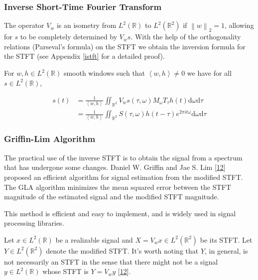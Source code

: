 \documentclass[american,]{article}
\theoremstyle{definition}
\theoremstyle{definition}
\theoremstyle{definition}
\theoremstyle{remark}
\begin{document}
\hypertarget{inverse-short-time-fourier-transform}{%
\subsubsection{Inverse Short-Time Fourier Transform}\label{inverse-short-time-fourier-transform}}

The operator \(V_w\) is an isometry from \(L^2(\mathbb{R})\) to \(L^2(\mathbb{R}^2)\)
if \(\left\lVert w\right\rVert_2=1\),
allowing for \(s\) to be completely determined by \(V_w s\).
With the help of the orthogonality relations (Parseval's formula) on the STFT we obtain
the inversion formula for the STFT (see Appendix \ref{istft} for a detailed proof).

For \(w,h\in L^2(\mathbb{R})\) smooth windows such that \(\left\langle w,h\right\rangle\neq 0\)
we have for all \(s\in L^2(\mathbb{R})\),

\begin{align}
s(t) &=\frac{1}{\left\langle w,h\right\rangle} \iint_{\mathbb{R}^2}V_w s(\tau,\omega)M_\omega T_\tau h(t) \mathrm{d}\omega\mathrm{d}\tau\\
     &= \frac{1}{\left\langle w,h\right\rangle}
        \iint_{\mathbb{R}^2} S(\tau,\omega) h(t-\tau) e^{2\pi it\omega} \mathrm{d}\omega\mathrm{d}\tau
\end{align}

\hypertarget{griffin-lim-algorithm}{%
\subsubsection{Griffin-Lim Algorithm}\label{griffin-lim-algorithm}}

The practical use of the inverse STFT is to obtain the signal
from a spectrum that has undergone some changes.
Daniel W. Griffin and Jae S. Lim {[}\protect\hyperlink{ref-griffin1983}{12}{]} proposed
an efficient algorithm for signal estimation from the modified STFT.
The GLA algorithm minimizes the mean squared error between the STFT magnitude
of the estimated signal and the modified STFT magnitude.

This method is efficient and easy to implement, and is widely
used in signal processing libraries.

Let \(x\in L^2(\mathbb{R})\) be a realizable signal and \(X=V_w x\in L^2(\mathbb{R}^2)\)
be its STFT. Let \(Y\in L^2(\mathbb{R}^2)\) denote the modified STFT.
It's worth noting that \(Y\), in general, is not necessarily an STFT
in the sense that there might not be a signal \(y\in L^2(\mathbb{R})\)
whose STFT is \(Y=V_w y\) {[}\protect\hyperlink{ref-griffin1983}{12}{]}.
\end{document}
